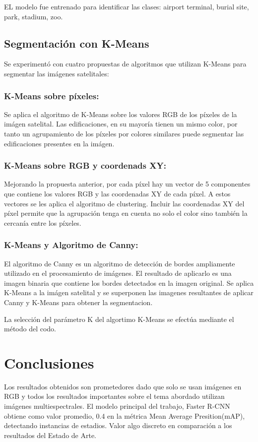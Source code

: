 \documentclass[article]{llncs}
\begin{document}
EL modelo fue entrenado para identificar las clases: airport terminal, burial site, park, stadium, zoo.

\subsection{Segmentaci\'on con K-Means}

Se experiment\'o con cuatro propuestas de algoritmos que utilizan K-Means para segmentar las im\'agenes satelitales:

\subsubsection{K-Means sobre p\'ixeles:}
Se aplica el algoritmo de K-Means sobre los valores RGB de los p\'ixeles de la im\'agen satelital. Las edificaciones, 
en su mayor\'ia tienen un mismo color, por tanto un agrupamiento de los p\'ixeles por colores similares puede segmentar 
las edificaciones presentes en la im\'agen.

\subsubsection{K-Means sobre RGB y coordenads XY:}
Mejorando la propuesta anterior, por cada p\'ixel hay un vector de 5 componentes 
que contiene los valores RGB y las coordenadas XY de cada p\'ixel. A estos vectores se les aplica el algoritmo de clustering. Incluir 
las coordenadas XY del p\'ixel permite que la agrupaci\'on tenga en cuenta no solo el color sino también la cercan\'ia 
entre los p\'ixeles. 

\subsubsection{K-Means y Algoritmo de Canny:}
El algoritmo de Canny es un algoritmo de detección de bordes ampliamente utilizado en el procesamiento de imágenes. 
El resultado de aplicarlo es una imagen binaria que contiene los bordes detectados en la imagen original. Se aplica 
K-Means a la im\'agen satelital y se superponen las imagenes resultantes de aplicar Canny y K-Means para obtener la segmentacion.

La selecci\'on del par\'ametro K del algortimo K-Means se efect\'ua mediante el m\'etodo del codo. 

\section{Conclusiones}
Los resultados obtenidos son prometedores dado que solo se usan im\'agenes en RGB y todos los resultados importantes 
sobre el tema abordado utilizan im\'agenes multiespectrales. El modelo principal del trabajo, Faster R-CNN  
obtiene como valor promedio, 0.4 en la m\'etrica Mean Average Presition(mAP), detectando instancias de estadios. Valor 
algo discreto en comparación a los resultados del Estado de Arte. 
\end{document}
